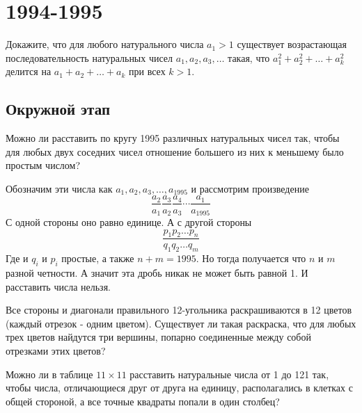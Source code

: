 \documentclass[11pt, a4paper]{common/document_template}
\begin{document}
\chapter{1994-1995}

\begin{exercise}
Докажите, что для любого натурального числа $a_{1} > 1$ существует возрастающая последовательность натуральных чисел $a_{1}, a_{2}, a_{3}, \dots$ такая, что $a_{1}^{2} + a_{2}^{2} + \dots + a_{k}^{2}$ делится на $a_{1} + a_{2} + \dots + a_{k}$ при всех $k > 1$.
\end{exercise}


\section{Окружной этап}

\begin{exercise}
Можно ли расставить по кругу 1995 различных натуральных чисел так, чтобы для любых двух соседних чисел отношение большего из них к меньшему было простым числом?
\end{exercise}

\begin{Solution}
Обозначим эти числа как $a_{1}, a_{2}, a_{3}, \dots, a_{1995}$ и рассмотрим произведение
$$
\frac{a_{2}}{a_{1}} \frac{a_{3}}{a_{2}}\frac{a_{4}}{a_{3}}\cdots \frac{a_{1}}{a_{1995}}
$$
С одной стороны оно равно единице. А с другой стороны
$$
\frac{p_{1} p_{2} \dots p_{n}}{q_{1}q_{2}\dots q_{m}}
$$
Где и $q_{i}$ и $p_{i}$ простые, а также $n + m = 1995$. Но тогда получается что $n$ и $m$ разной четности. А значит эта дробь никак не может быть равной 1. И расставить числа нельзя.
\end{Solution}


\begin{exercise}
Все стороны и диагонали правильного 12-угольника раскрашиваются в 12 цветов (каждый отрезок - одним цветом).
Существует ли такая раскраска, что для любых трех цветов найдутся три вершины, попарно соединенные между собой отрезками этих цветов?
\end{exercise}

\begin{Solution}
 
\end{Solution}

\begin{exercise}
Можно ли в таблице $11 \times 11$ расставить натуральные числа от 1 до 121 так, чтобы числа, отличающиеся друг от друга на единицу, располагались в клетках с общей стороной, а все точные квадраты попали в один столбец?
\end{exercise}
\end{document}

